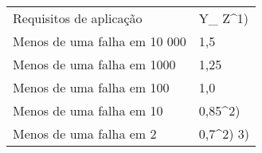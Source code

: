 \begin{table}[]
\begin{tabular}{ll}
Requisitos de aplicação      & Y_ Z^1)    \\
Menos de uma falha em 10 000 & 1,5       \\
Menos de uma falha em 1000   & 1,25      \\
Menos de uma falha em 100    & 1,0       \\
Menos de uma falha em 10     & 0,85^2)   \\
Menos de uma falha em 2      & 0,7^2) 3)
\end{tabular}
\end{table}